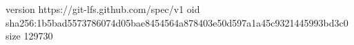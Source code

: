 version https://git-lfs.github.com/spec/v1
oid sha256:1b5bad5573786074d05bae8454564a878403e50d597a1a45c9321445993bd3c0
size 129730
